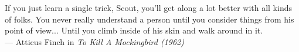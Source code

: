\thispagestyle{empty}
{}

\vspace*{3cm}

\begin{center}
    If you just learn a single trick, Scout, you'll get along a lot better with all kinds of folks. You never really understand a person until you consider things from his point of view... Until you climb inside of his skin and walk around in it.  \\ \medskip
    — Atticus Finch in \emph{To Kill A Mockingbird (1962)}   
\end{center}